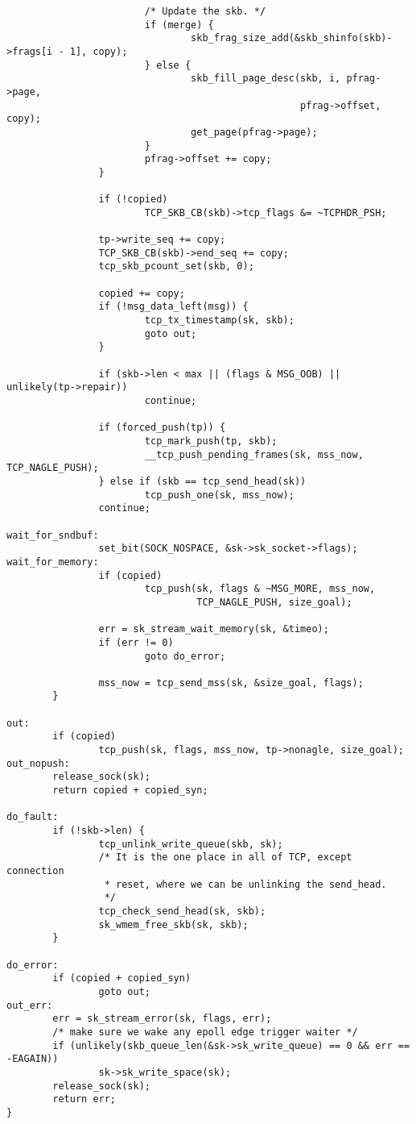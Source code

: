 \begin{verbatim}
                        /* Update the skb. */
                        if (merge) {
                                skb_frag_size_add(&skb_shinfo(skb)->frags[i - 1], copy);
                        } else {
                                skb_fill_page_desc(skb, i, pfrag->page,
                                                   pfrag->offset, copy);
                                get_page(pfrag->page);
                        }
                        pfrag->offset += copy;
                }

                if (!copied)
                        TCP_SKB_CB(skb)->tcp_flags &= ~TCPHDR_PSH;

                tp->write_seq += copy;
                TCP_SKB_CB(skb)->end_seq += copy;
                tcp_skb_pcount_set(skb, 0);

                copied += copy;
                if (!msg_data_left(msg)) {
                        tcp_tx_timestamp(sk, skb);
                        goto out;
                }

                if (skb->len < max || (flags & MSG_OOB) || unlikely(tp->repair))
                        continue;

                if (forced_push(tp)) {
                        tcp_mark_push(tp, skb);
                        __tcp_push_pending_frames(sk, mss_now, TCP_NAGLE_PUSH);
                } else if (skb == tcp_send_head(sk))
                        tcp_push_one(sk, mss_now);
                continue;

wait_for_sndbuf:
                set_bit(SOCK_NOSPACE, &sk->sk_socket->flags);
wait_for_memory:
                if (copied)
                        tcp_push(sk, flags & ~MSG_MORE, mss_now,
                                 TCP_NAGLE_PUSH, size_goal);

                err = sk_stream_wait_memory(sk, &timeo);
                if (err != 0)
                        goto do_error;

                mss_now = tcp_send_mss(sk, &size_goal, flags);
        }

out:
        if (copied)
                tcp_push(sk, flags, mss_now, tp->nonagle, size_goal);
out_nopush:
        release_sock(sk);
        return copied + copied_syn;

do_fault:
        if (!skb->len) {
                tcp_unlink_write_queue(skb, sk);
                /* It is the one place in all of TCP, except connection
                 * reset, where we can be unlinking the send_head.
                 */
                tcp_check_send_head(sk, skb);
                sk_wmem_free_skb(sk, skb);
        }

do_error:
        if (copied + copied_syn)
                goto out;
out_err:
        err = sk_stream_error(sk, flags, err);
        /* make sure we wake any epoll edge trigger waiter */
        if (unlikely(skb_queue_len(&sk->sk_write_queue) == 0 && err == -EAGAIN))
                sk->sk_write_space(sk);
        release_sock(sk);
        return err;
}
\end{verbatim}

